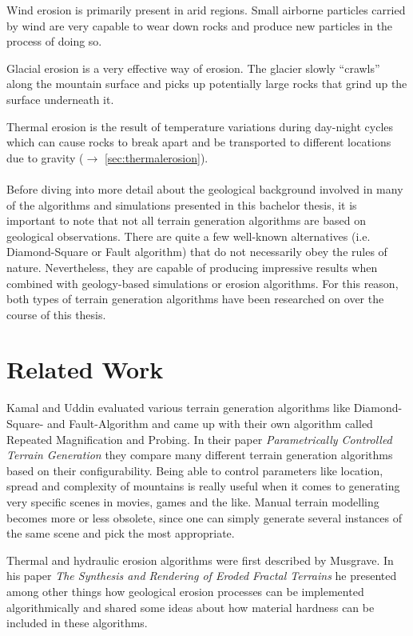 \documentclass[11pt,a4paper,twoside,openright]{report}
\begin{document}
Wind erosion is primarily present in arid regions. Small airborne particles carried by wind are very capable to wear down rocks and produce new particles in the process of doing so.

Glacial erosion is a very effective way of erosion. The glacier slowly ``crawls'' along the mountain surface and picks up potentially large rocks that grind up the surface underneath it.

Thermal erosion is the result of temperature variations during day-night cycles which can cause rocks to break apart and be transported to different locations due to gravity ($\rightarrow$ \cref{sec:thermalerosion}).
\\ \\
Before diving into more detail about the geological background involved in many of the algorithms and simulations presented in this bachelor thesis, it is important to note that not all terrain generation algorithms are based on geological observations. There are quite a few well-known alternatives (i.e. Diamond-Square or Fault algorithm) that do not necessarily obey the rules of nature. Nevertheless, they are capable of producing impressive results when combined with geology-based simulations or erosion algorithms. For this reason, both types of terrain generation algorithms have been researched on over the course of this thesis.

\chapter{Related Work}
\label{sec:related}
Kamal and Uddin evaluated various terrain generation algorithms like Diamond-Square- and Fault-Algorithm and came up with their own algorithm called Repeated Magnification and Probing. In their paper \emph{Parametrically Controlled Terrain Generation} \cite{Kamal:2007:PCT:1321261.1321264} they compare many different terrain generation algorithms based on their configurability. Being able to control parameters like location, spread and complexity of mountains is really useful when it comes to generating very specific scenes in movies, games and the like. Manual terrain modelling becomes more or less obsolete, since one can simply generate several instances of the same scene and pick the most appropriate.

Thermal and hydraulic erosion algorithms were first described by Musgrave. In his paper  \emph{The Synthesis and Rendering of Eroded Fractal Terrains} \cite{Musgrave:1989:SRE:74333.74337} he presented among other things how geological erosion processes can be implemented algorithmically and shared some ideas about how material hardness can be included in these algorithms.
\end{document}
